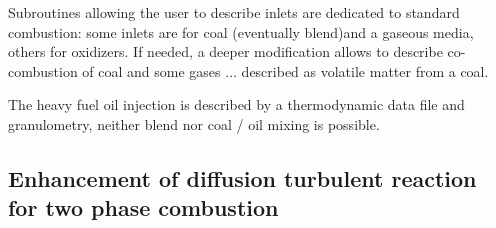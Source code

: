 Subroutines allowing the user to describe inlets are dedicated to standard
combustion: some inlets are for coal (eventually blend)and a gaseous media,
others for oxidizers. If needed, a deeper modification allows to describe
co-combustion of coal and some gases ... described as volatile matter from a
coal.

The heavy fuel oil injection is described by a thermodynamic data file and
granulometry, neither blend nor coal / oil mixing is possible.

\subsection[Diffusion turbulent reaction]{Enhancement of diffusion turbulent reaction for two phase combustion}

